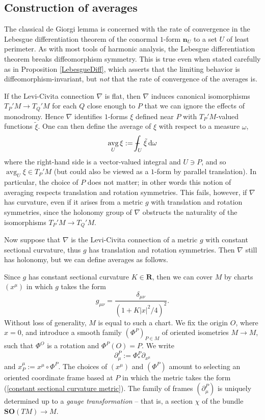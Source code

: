 \documentclass[reqno,11pt]{amsart}
\newcommand{\RR}{\mathbf{R}}
\newcommand{\SpOrth}{\mathbf{SO}}
\DeclareMathOperator{\avg}{avg}
\newcommand*\dif{\mathop{}\!\mathrm{d}}
\newcommand{\normal}{\mathbf n}
\newcommand{\dfn}[1]{\emph{#1}\index{#1}}
\theoremstyle{definition}
\numberwithin{equation}{section}
\def\Xint#1{\mathchoice
{\XXint\displaystyle\textstyle{#1}}%
{\XXint\textstyle\scriptstyle{#1}}%
{\XXint\scriptstyle\scriptscriptstyle{#1}}%
{\XXint\scriptscriptstyle\scriptscriptstyle{#1}}%
\!\int}
\def\XXint#1#2#3{{\setbox0=\hbox{$#1{#2#3}{\int}$ }
\vcenter{\hbox{$#2#3$ }}\kern-.6\wd0}}
\def\dashint{\Xint-}
\begin{document}
\subsection{Construction of averages}
The classical de Giorgi lemma is concerned with the rate of convergence in the Lebesgue differentiation theorem of the conormal $1$-form $\normal_U$ to a set $U$ of least perimeter.
As with most tools of harmonic analysis, the Lebesgue differentiation theorem breaks diffeomorphism symmetry.
This is true even when stated carefully as in Proposition \ref{LebesgueDiff}, which asserts that the limiting behavior is diffeomorphism-invariant, but \emph{not} that the rate of convergence of the averages is.

If the Levi-Civita connection $\nabla$ is flat, then $\nabla$ induces canonical isomorphisms $T_P'M \to T_Q'M$ for each $Q$ close enough to $P$ that we can ignore the effects of monodromy.
Hence $\nabla$ identifies $1$-forms $\xi$ defined near $P$ with $T_P'M$-valued functions $\tilde \xi$.
One can then define the average of $\xi$ with respect to a measure $\omega$,
\begin{equation}\label{averages and flat connections}
\avg_U \xi := \dashint_U \tilde \xi \dif \omega
\end{equation}
where the right-hand side is a vector-valued integral and $U \ni P$, and so $\avg_U \xi \in T_P'M$ (but could also be viewed as a $1$-form by parallel translation).
In particular, the choice of $P$ does not matter; in other words this notion of averaging respects translation and rotation symmetries.
This fails, however, if $\nabla$ has curvature, even if it arises from a metric $g$ with translation and rotation symmetries, since the holonomy group of $\nabla$ obstructs the naturality of the isomorphisms $T_P'M \to T_Q'M$.

Now suppose that $\nabla$ is the Levi-Civita connection of a metric $g$ with constant sectional curvature, thus $g$ has translation and rotation symmetries.
Then $\nabla$ still has holonomy, but we can define averages as follows.

Since $g$ has constant sectional curvature $K \in \RR$, then we can cover $M$ by charts $(x^\mu)$ in which $g$ takes the form
\begin{equation}\label{constant sectional curvature metric}
g_{\mu\nu} = \frac{\delta_{\mu\nu}}{(1 + K|x|^2/4)^2}.
\end{equation}
Without loss of generality, $M$ is equal to such a chart.
We fix the origin $O$, where $x = 0$, and introduce a smooth family $(\Phi^P)_{P \in M}$ of oriented isometries $M \to M$, such that $\Phi^O$ is a rotation and $\Phi^P(O) = P$.
We write
$$\partial^P_\mu := \Phi^P_* \partial_{x^\mu}$$
and $x^\mu_P := x^\mu \circ \Phi^P$.
The choices of $(x^\mu)$ and $(\Phi^P)$ amount to selecting an oriented coordinate frame based at $P$ in which the metric takes the form (\ref{constant sectional curvature metric}).
The family of frames $(\partial^P_\mu)$ is uniquely determined up to a \dfn{gauge transformation} -- that is, a section $\chi$ of the bundle $\SpOrth(TM) \to M$.
\end{document}
